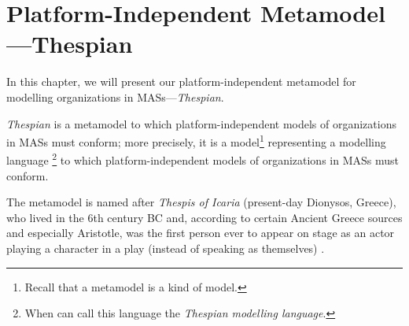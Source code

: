 
\chapter{Platform-Independent Metamodel---Thespian}

In this chapter, we will present our platform-independent metamodel for modelling organizations in MASs---\textit{Thespian}.

\textit{Thespian} is a metamodel to which platform-independent models of organizations in MASs must conform; more precisely, it is a model\footnote{Recall that a metamodel is a kind of model.} representing a modelling language \footnote{When can call this language the \textit{Thespian modelling language}.} to which platform-independent models of organizations in MASs must conform.

The metamodel is named after \textit{Thespis of Icaria} (present-day Dionysos, Greece), who lived in the 6th century BC and, according to certain Ancient Greece sources and especially Aristotle, was the first person ever to appear on stage as an actor playing a character in a play (instead of speaking as themselves) \cite{Wikipedia-Thespis}.

